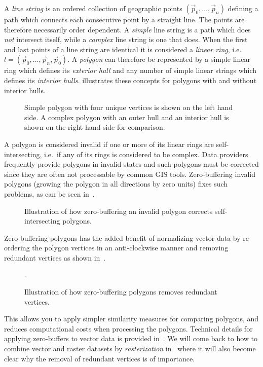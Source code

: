 A \textit{line string} is an ordered collection of geographic points $(\vec{p}_0, \ldots, \vec{p}_n)$ defining a path which connects each consecutive point by a straight line.
The points are therefore necessarily order dependent.
A \textit{simple} line string is a path which does \textit{not} intersect itself, while a \textit{complex} line string is one that does.
When the first and last points of a line string are identical it is considered a \textit{linear ring}, i.e.\ $l = (\vec{p}_0, \ldots, \vec{p}_n, \vec{p}_0)$.
A \textit{polygon} can therefore be represented by a simple linear ring which defines its \textit{exterior hull} and any number of simple linear strings which defines its \textit{interior hulls}.
 illustrates these concepts for polygons with and without interior hulls. %

\begin{figure}[htb]
  \centering
  
  \textcolor{gray}{\vrule}
  \hspace{0.01\linewidth}
  
  \caption{%
    Simple polygon with four unique vertices is shown on the left hand side.
    A complex polygon with an outer hull
    and an interior hull is shown on the right hand side for comparison.
  }%
  \label{fig:polygon-representation}
\end{figure}

A polygon is considered invalid if one or more of its linear rings are self-intersecting, i.e.\ if any of its rings is considered to be complex.
Data providers frequently provide polygons in invalid states and such polygons must be corrected since they are often not processable by common GIS tools.
Zero-buffering invalid polygons (growing the polygon in all directions by zero units) fixes such problems, as can be seen in~.

\begin{figure}[H]
  \centering
  
  \caption{Illustration of how zero-buffering an invalid polygon corrects self-intersecting polygons.}%
  \label{fig:complex-zero-buffer}
\end{figure}

Zero-buffering polygons has the added benefit of normalizing vector data by re-ordering the polygon vertices in an anti-clockwise manner and removing redundant vertices as shown in~.

\begin{figure}[H]
  \centering
  
  \caption{Illustration of how zero-buffering polygons removes redundant vertices.}%
  \label{fig:redundant-zero-buffer}.
\end{figure}

This allows you to apply simpler similarity measures for comparing polygons, and reduces computational costs when processing the polygons.
Technical details for applying zero-buffers to vector data is provided in~.
We will come back to how to combine vector and raster datasets by \textit{rasterization} in~ where it will also become clear why the removal of redundant vertices is of importance.
